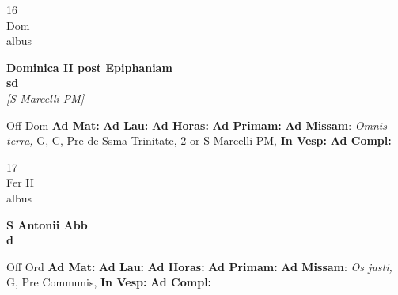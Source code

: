\documentclass[10pt, openany]{book}
\begin{document}
    \begin{center}
        \begin{minipage}{3.5in}
            \vspace{2em}
            \begin{minipage}{0.5in}
                {\Huge 16} \\
                {\normalsize Dom} \\
                {\normalsize albus}
            \end{minipage}
            \begin{minipage}{3.0in}
                \textbf{ \large Dominica II post Epiphaniam \\
                \textnormal{\normalsize sd}} \\ \textit{[S Marcelli PM]} \\ 
            \end{minipage}
            \begin{justify}Off Dom
                \textbf{Ad Mat: }
                \textbf{Ad Lau: }
                \textbf{Ad Horas: }
                \textbf{Ad Primam: }\textbf{Ad Missam}: \textit{Omnis terra,} G, C, Pre de Ssma Trinitate, 2 or S Marcelli PM,  
                \textbf{In Vesp: }
                \textbf{Ad Compl: }
            \end{justify}
        \end{minipage}
    \end{center}

    \begin{center}
        \begin{minipage}{3.5in}
            \vspace{2em}
            \begin{minipage}{0.5in}
                {\Huge 17} \\
                {\normalsize Fer II} \\
                {\normalsize albus}
            \end{minipage}
            \begin{minipage}{3.0in}
                \textbf{ \large S Antonii Abb \\
                \textnormal{\normalsize d}} \\ 
            \end{minipage}
            \begin{justify}Off Ord
                \textbf{Ad Mat: }
                \textbf{Ad Lau: }
                \textbf{Ad Horas: }
                \textbf{Ad Primam: }\textbf{Ad Missam}: \textit{Os justi,} G, Pre Communis,  
                \textbf{In Vesp: }
                \textbf{Ad Compl: }
            \end{justify}
        \end{minipage}
    \end{center}
\end{document}
